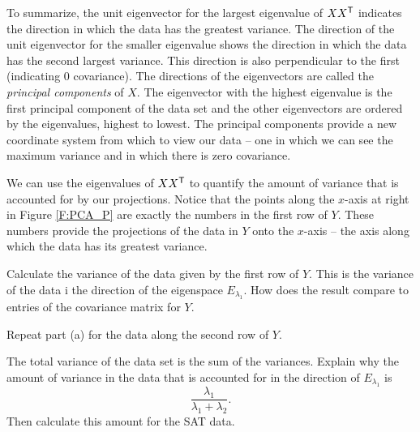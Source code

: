 To summarize, the unit eigenvector for the largest eigenvalue of $XX^{\mathsf{T}}$ indicates the direction in which the data has the greatest variance. The direction of the unit eigenvector for the smaller eigenvalue shows the direction in which the data has the second largest variance. This direction is also perpendicular to the first (indicating $0$ covariance). The directions of the eigenvectors are called the \emph{principal components} of $X$. The eigenvector with the highest eigenvalue is the first principal component of the data set and the other eigenvectors are ordered by the eigenvalues, highest to lowest. The principal components provide a new coordinate system from which to view our data -- one in which we can see the maximum variance and in which there is zero covariance. 

\begin{pactivity} \label{act:PCA_variances} We can use the eigenvalues of $XX^{\mathsf{T}}$ to quantify the amount of variance that is accounted for by our projections. Notice that the points along the $x$-axis at right in Figure \ref{F:PCA_P} are exactly the numbers in the first row of $Y$. These numbers provide the projections of the data in $Y$ onto the $x$-axis -- the axis along which the data has its greatest variance.
\ba
\item Calculate the variance of the data given by the first row of $Y$. This is the variance of the data i the direction of the eigenspace $E_{\lambda_1}$. How does the result compare to entries of the covariance matrix for $Y$.


\item Repeat part (a) for the data along the second row of $Y$. 



\item The total variance of the data set is the sum of the variances. Explain why the amount of variance in the data that is accounted for in the direction of $E_{\lambda_1}$ is 
\[\frac{\lambda_1}{\lambda_1 + \lambda_2}.\]
Then calculate this amount for the SAT data. 

\ea

\end{pactivity}

